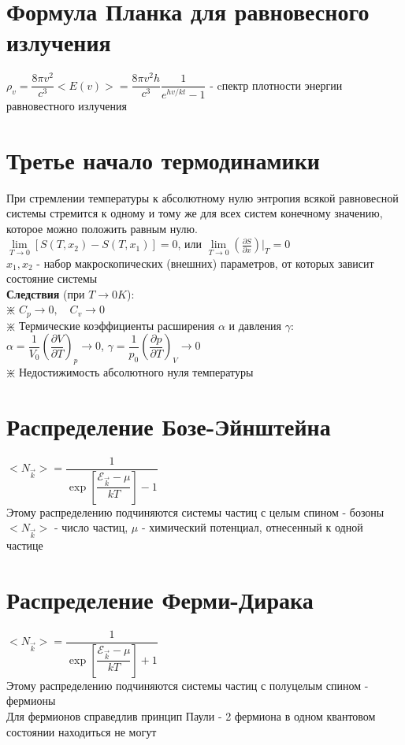 \begin{multicols*}{2}
		\section{Формула Планка для равновесного излучения}
		$\rho_v=\dfrac{8\pi v^2}{c^3}<E(v)>=\dfrac{8\pi v^2 h}{c^3}\dfrac{1}{e^{hv/kt}-1}$ - cпектр плотности энергии равновестного излучения\\

		\section{Третье начало термодинамики}
		При стремлении температуры к абсолютному  нулю энтропия всякой равновесной системы стремится к одному и тому же для всех систем конечному значению, которое можно положить равным нулю.\\
		$\lim\limits_{T\to 0} [S(T, x_2) - S(T, x_1)] =0$, или $\lim\limits_{T\to 0} \left(\frac{\partial S}{\partial x}\right)\vert _T = 0$\\
		$x_1, x_2$ - набор макроскопических (внешних) параметров, от которых зависит состояние системы\\
		\textbf{Следствия} (при $T\rightarrow 0K$):\\
		$\divideontimes$ $C_p \rightarrow 0, \quad C_v \rightarrow 0$\\
		$\divideontimes$ Термические коэффициенты расширения $\alpha$ и давления $\gamma$:\\
		$\alpha = \dfrac{1}{V_0}\left(\dfrac{\partial V}{\partial T}\right)_p \rightarrow 0$, \quad $\gamma = \dfrac{1}{p_0}\left(\dfrac{\partial p}{\partial T}\right)_V \rightarrow 0$\\
		$\divideontimes$ Недостижимость абсолютного нуля температуры\\

		\section{Распределение Бозе-Эйнштейна}
		$<N_{\vec{k}}> = \dfrac{1}{\exp\left[\dfrac{\mathcal{E}_{\vec{k}} - \mu}{kT}\right] - 1}$\\
		Этому распределению подчиняются системы частиц с целым спином - бозоны\\
		$<N_{\vec{k}}>$ - число частиц, $\mu$ - химический потенциал, отнесенный к одной частице\\

		\section{Распределение Ферми-Дирака}
		$<N_{\vec{k}}> = \dfrac{1}{\exp\left[\dfrac{\mathcal{E}_{\vec{k}} - \mu}{kT}\right] + 1}$\\
		Этому распределению подчиняются системы частиц с полуцелым спином - фермионы\\
		Для фермионов справедлив принцип Паули - 2 фермиона в одном квантовом состоянии находиться не могут\\


\end{multicols*}
